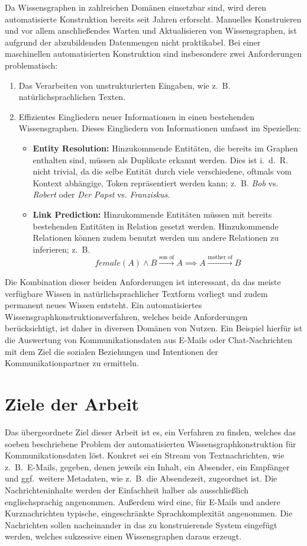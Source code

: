 Da Wissensgraphen in zahlreichen Domänen einsetzbar sind, wird deren automatisierte Konstruktion bereits seit Jahren erforscht.
Manuelles Konstruieren und vor allem anschließendes Warten und Aktualisieren von Wissensgraphen, ist aufgrund der abzubildenden Datenmengen nicht praktikabel.
Bei einer maschinellen automatisierten Konstruktion sind insbesondere zwei Anforderungen problematisch:
\begin{enumerate}
	\item Das Verarbeiten von unstrukturierten Eingaben, wie z.~B. natürlichsprachlichen Texten.
	\item Effizientes Eingliedern neuer Informationen in einen bestehenden Wissensgraphen.
		Dieses Eingliedern von Informationen umfasst im Speziellen:
		\begin{itemize}
			\item \textbf{Entity Resolution:}
				Hinzukommende Entitäten, die bereits im Graphen enthalten sind, müssen als Duplikate erkannt werden.
				Dies ist i.~d.~R. nicht trivial, da die selbe Entität durch viele verschiedene, oftmals vom Kontext abhängige, Token repräsentiert werden kann;
				z.~B. \textit{Bob} vs. \textit{Robert} oder \textit{Der Papst} vs. \textit{Franziskus}.
			\item \textbf{Link Prediction:}
				Hinzukommende Entitäten müssen mit bereits bestehenden Entitäten in Relation gesetzt werden.
				Hinzukommende Relationen können zudem benutzt werden um andere Relationen zu inferieren;
				z.~B. \[female(A) \land B \xrightarrow{\text{son~of}} A \implies A \xrightarrow{\text{mother~of}} B\]
		\end{itemize}
\end{enumerate}

Die Kombination dieser beiden Anforderungen ist interessant, da das meiste verfügbare Wissen in natürlichsprachlicher Textform vorliegt und zudem permanent neues Wissen entsteht.
Ein automatisiertes Wissensgraphkonstruktionsverfahren, welches beide Anforderungen berücksichtigt, ist daher in diversen Domänen von Nutzen.
Ein Beispiel hierfür ist die Auswertung von Kommunikationsdaten aus E-Mails oder Chat-Nachrichten mit dem Ziel die sozialen Beziehungen und Intentionen der Kommunikationpartner zu ermitteln.

\section{Ziele der Arbeit}%
\label{sec:intro:goals}

Das übergeordnete Ziel dieser Arbeit ist es, ein Verfahren zu finden, welches das soeben beschriebene Problem der automatisierten Wissensgraphkonstruktion für Kommunikationsdaten löst.
Konkret sei ein Stream von Textnachrichten, wie z.~B.\ E-Mails, gegeben, denen jeweils ein Inhalt, ein Absender, ein Empfänger und ggf.\ weitere Metadaten, wie z.~B. die Absendezeit, zugeordnet ist.
Die Nachrichteninhalte werden der Einfachheit halber als ausschließlich englischsprachig angenommen.
Außerdem wird eine, für E-Mails und andere Kurznachrichten typische, eingeschränkte Sprachkomplexität angenommen.
Die Nachrichten sollen nacheinander in das zu konstruierende System eingefügt werden, welches sukzessive einen Wissensgraphen daraus erzeugt.

